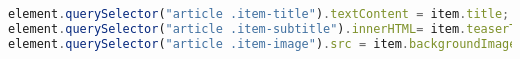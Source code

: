 \begin{lstlisting}[language= Javascript,caption=Das Einfügen von Titel sowie Teasertext und Bild., label={lst:artikelinfos}]
element.querySelector("article .item-title").textContent = item.title;
element.querySelector("article .item-subtitle").innerHTML= item.teaserText;
element.querySelector("article .item-image").src = item.backgroundImage;
\end{lstlisting} 